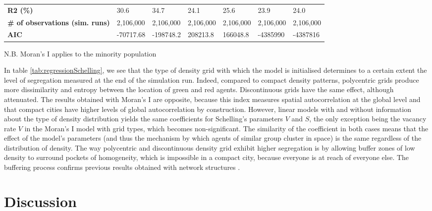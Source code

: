\documentclass[Royal,sageh,times]{sagej}
\begin{document}
\begin{table}[]
\begin{adjustwidth}{-1cm}{-1cm}
\begin{tabular}{|m{2.5cm}|ll|ll|ll|}
\textbf{R2 (\%)}                            & 30.6       & 34.7                             & 24.1              & 25.6              & 23.9                 & 24.0                    \\ 
\textbf{\# of observations (sim. runs)}     & 2,106,000  & 2,106,000 						 & 2,106,000          & 2,106,000          & 2,106,000             & 2,106,000                \\ 
\textbf{AIC}                                & -70717.68   & -198748.2  						& 208213.8          & 166048.8          & -4385990             & -4387816                 \\ \hline
\end{tabular}
\end{adjustwidth}
N.B. Moran's I applies to the minority population
\end{table}

In table \ref{tab:regressionSchelling}, we see that the type of density grid with which the model is initialised determines to a certain extent the level of segregation measured at the end of the simulation run. Indeed, compared to compact density patterns, polycentric grids produce more dissimilarity and entropy between the location of green and red agents. Discontinuous grids have the same effect, although attenuated. The results obtained with Moran's I are opposite, because this index measures spatial autocorrelation at the global level and that compact cities have higher levels of global autocorrelation by construction. However, linear models with and without information about the type of density distribution yields the same coefficients for Schelling's parameters $V$ and $S$, the only exception being the vacancy rate $V$ in the Moran's I model with grid types, which becomes non-significant. The similarity of the coefficient in both cases means that the effect of the model's parameters (and thus the mechanism by which agents of similar group cluster in space) is the same regardless of the distribution of density. The way polycentric and discontinuous density grid exhibit higher segregation is by allowing buffer zones of low density to surround pockets of homogeneity, which is impossible in a compact city, because everyone is at reach of everyone else. The buffering process confirms previous results obtained with network structures \citep{Banos2012}.


\section{Discussion}
\end{document}
